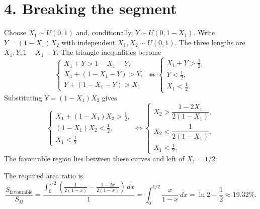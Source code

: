 \documentclass[a4paper]{article}
\begin{document}
\section*{4. Breaking the segment}
Choose $X_1\sim U(0,1)$ and, conditionally, $Y\sim U(0,1-X_1)$.
Write $Y=(1-X_1)X_2$ with independent $X_1,X_2\sim U(0,1)$.
The three lengths are $X_1,Y,1-X_1-Y$. The triangle inequalities become
\[
\begin{cases}X_1+Y>1-X_1-Y,\\X_1+(1-X_1-Y)>Y,\\Y+(1-X_1-Y)>X_1\end{cases}
\iff
\begin{cases}X_1+Y>\tfrac12,\\Y<\tfrac12,\\X_1<\tfrac12.\end{cases}
\]
Substituting $Y=(1-X_1)X_2$ gives
\[
\begin{cases}X_1+(1-X_1)X_2>\tfrac12,\\(1-X_1)X_2<\tfrac12,\\X_1<\tfrac12\end{cases}
\iff
\begin{cases}X_2>\dfrac{1-2X_1}{2(1-X_1)},\\X_2<\dfrac1{2(1-X_1)},\\X_1<\tfrac12.\end{cases}
\]
The favourable region lies between these curves and left of $X_1=1/2$:
\begin{center}
\end{center}
The required area ratio is
\[
\frac{S_{\mathrm{favourable}}}{S_\Omega}
=\frac{\displaystyle\int_0^{1/2}\left(\frac1{2(1-x)}-\frac{1-2x}{2(1-x)}\right)\,dx}{1}
=\int_0^{1/2}\frac{x}{1-x}\,dx=\ln2-\frac12\approx19.32\%.
\]
\end{document}
